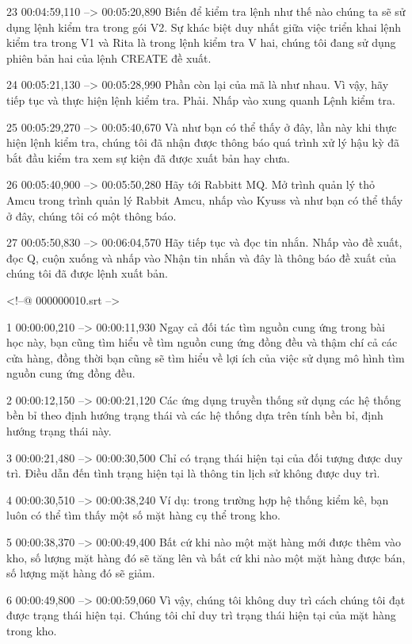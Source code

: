 23
00:04:59,110 --> 00:05:20,890
Biến để kiểm tra lệnh như thế nào chúng ta sẽ sử dụng lệnh kiểm tra trong gói V2.  Sự khác biệt duy nhất giữa việc triển khai lệnh kiểm tra trong V1 và Rita là trong lệnh kiểm tra V hai, chúng tôi đang sử dụng phiên bản hai của lệnh CREATE đề xuất.

24
00:05:21,130 --> 00:05:28,990
Phần còn lại của mã là như nhau.  Vì vậy, hãy tiếp tục và thực hiện lệnh kiểm tra.  Phải.  Nhấp vào xung quanh Lệnh kiểm tra.

25
00:05:29,270 --> 00:05:40,670
Và như bạn có thể thấy ở đây, lần này khi thực hiện lệnh kiểm tra, chúng tôi đã nhận được thông báo quá trình xử lý hậu kỳ đã bắt đầu kiểm tra xem sự kiện đã được xuất bản hay chưa.

26
00:05:40,900 --> 00:05:50,280
Hãy tới Rabbitt MQ.  Mở trình quản lý thỏ Amcu trong trình quản lý Rabbit Amcu, nhấp vào Kyuss và như bạn có thể thấy ở đây, chúng tôi có một thông báo.

27
00:05:50,830 --> 00:06:04,570
Hãy tiếp tục và đọc tin nhắn.  Nhấp vào đề xuất, đọc Q, cuộn xuống và nhấp vào Nhận tin nhắn và đây là thông báo đề xuất của chúng tôi đã được lệnh xuất bản.

<!--@ 000000010.srt -->

1
00:00:00,210 --> 00:00:11,930
Ngay cả đối tác tìm nguồn cung ứng trong bài học này, bạn cũng tìm hiểu về tìm nguồn cung ứng đồng đều và thậm chí cả các cửa hàng, đồng thời bạn cũng sẽ tìm hiểu về lợi ích của việc sử dụng mô hình tìm nguồn cung ứng đồng đều.

2
00:00:12,150 --> 00:00:21,120
Các ứng dụng truyền thống sử dụng các hệ thống bền bỉ theo định hướng trạng thái và các hệ thống dựa trên tính bền bỉ, định hướng trạng thái này.

3
00:00:21,480 --> 00:00:30,500
Chỉ có trạng thái hiện tại của đối tượng được duy trì.  Điều dẫn đến tình trạng hiện tại là thông tin lịch sử không được duy trì.

4
00:00:30,510 --> 00:00:38,240
Ví dụ: trong trường hợp hệ thống kiểm kê, bạn luôn có thể tìm thấy một số mặt hàng cụ thể trong kho.

5
00:00:38,370 --> 00:00:49,400
Bất cứ khi nào một mặt hàng mới được thêm vào kho, số lượng mặt hàng đó sẽ tăng lên và bất cứ khi nào một mặt hàng được bán, số lượng mặt hàng đó sẽ giảm.

6
00:00:49,800 --> 00:00:59,060
Vì vậy, chúng tôi không duy trì cách chúng tôi đạt được trạng thái hiện tại.  Chúng tôi chỉ duy trì trạng thái hiện tại của mặt hàng trong kho.

